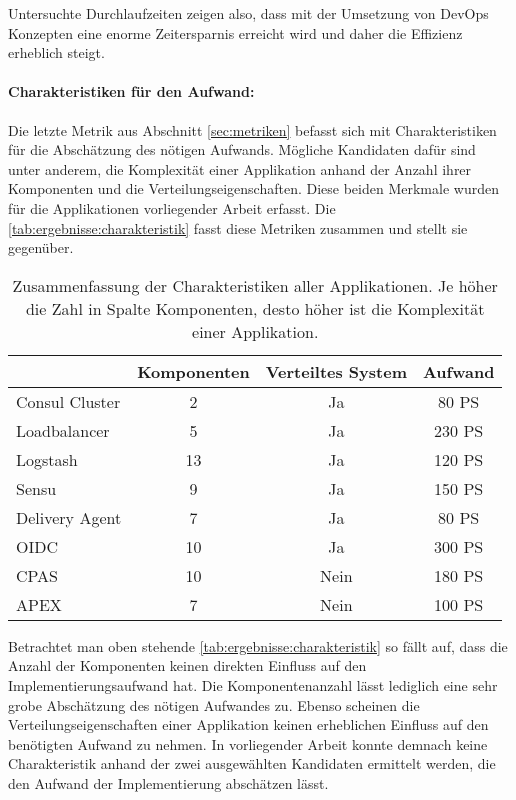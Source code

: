 Untersuchte Durchlaufzeiten zeigen also, dass mit der Umsetzung von DevOps Konzepten eine enorme Zeitersparnis erreicht wird und daher die Effizienz erheblich steigt. 

\paragraph{Charakteristiken für den Aufwand:}
Die letzte Metrik aus Abschnitt \ref{sec:metriken} befasst sich mit Charakteristiken für die Abschätzung des nötigen Aufwands. Mögliche Kandidaten dafür sind unter anderem, die Komplexität einer Applikation anhand der Anzahl ihrer Komponenten und die Verteilungseigenschaften. Diese beiden Merkmale wurden für die Applikationen vorliegender Arbeit erfasst. Die \autoref{tab:ergebnisse:charakteristik} fasst diese Metriken zusammen und stellt sie gegenüber.

\begin{table}[ht]
\setlength{\tabcolsep}{5pt}
\renewcommand{\arraystretch}{1.5}
\centering
\begin{tabular}{|l|c|c|c|}
\hline
\rowcolor[HTML]{C0C0C0}
\multicolumn{1}{|c|}{\textbf{Applikation}} & \textbf{Komponenten} & \textbf{Verteiltes System} & \textbf{Aufwand} \\ 
\hline
Consul Cluster		& 2 		& Ja 	& 80 PS \\ 
\hline
Loadbalancer			& 5 		& Ja 	& 230 PS \\ 
\hline						
Logstash				& 13 	& Ja		& 120 PS \\
\hline
Sensu				& 9		& Ja		& 150 PS \\
\hline
Delivery Agent		& 7		& Ja		& 80 PS	 \\
\hline
OIDC					& 10		& Ja		& 300 PS  \\
\hline
CPAS					& 10		& Nein	& 180 PS  \\
\hline
APEX					& 7		& Nein	& 100 PS	  \\
\hline
\end{tabular} 
\caption[Zusammenfassung der Charakteristiken aller Applikationen]{Zusammenfassung der Charakteristiken aller Applikationen. Je höher die Zahl in Spalte Komponenten, desto höher ist die Komplexität einer Applikation.}
\label{tab:ergebnisse:charakteristik}
\end{table}

Betrachtet man oben stehende \autoref{tab:ergebnisse:charakteristik} so fällt auf, dass die Anzahl der Komponenten keinen direkten Einfluss auf den Implementierungsaufwand hat. Die Komponentenanzahl lässt lediglich eine sehr grobe Abschätzung des nötigen Aufwandes zu. Ebenso scheinen die Verteilungseigenschaften einer Applikation keinen erheblichen Einfluss auf den benötigten Aufwand zu nehmen. In vorliegender Arbeit konnte demnach keine Charakteristik anhand der zwei ausgewählten Kandidaten ermittelt werden, die den Aufwand der Implementierung abschätzen lässt.

